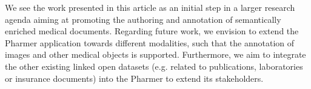 \documentclass[conference]{IEEEtran}
\begin{document}
We see the work presented in this article as an initial step in a larger research agenda aiming at promoting the authoring and annotation of semantically enriched medical documents.
Regarding future work, we envision to extend the Pharmer application towards different modalities, such that the annotation of images and other medical objects is supported.
Furthermore, we aim to integrate the other existing linked open datasets (e.g. related to publications, laboratories or insurance documents) into the Pharmer to extend its stakeholders.





\end{document}
